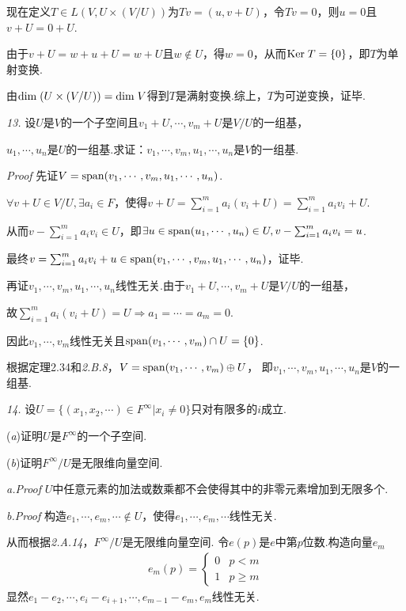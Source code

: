 现在定义\(T \in L(V,U \times (V/U))\)为\(Tv=(u,v+U)\)，令\(Tv=0\)，则\(u=0\)且\(v+U=0+U\).

由于\(v+U=w+u+U=w+U\)且\(w \notin U\)，得\(w=0\)，从而\(\mathrm{Ker \;} T=\{0\}\)，即\(T\)为单射变换.

由\(\mathrm{dim \;} (U \times (V/U))=\mathrm{dim \;} V\)得到\(T\)是满射变换.综上，\(T\)为可逆变换，证毕.

\newpage

\textit{13.}
设\(U\)是\(V\)的一个子空间且\(v_1+U,\cdots,v_m+U\)是\(V/U\)的一组基，

\(u_1,\cdots,u_n\)是\(U\)的一组基.求证：\(v_1,\cdots,v_m,u_1,\cdots,u_n\)是\(V\)的一组基.

\textit{Proof}
先证\(V=\mathrm{span} (v_1,\cdots,v_m,u_1,\cdots,u_n)\).

\(\forall v+U \in V/U, \exists a_i \in F\)，使得\(v+U=\sum_{i=1}^m a_i(v_i+U)=\sum_{i=1}^m a_iv_i+U\).

从而\(v-\sum_{i=1}^m a_iv_i \in U\)，即\(\exists u \in \mathrm{span} (u_1,\cdots,u_n) \in U,v-\sum_{i=1}^m a_iv_i=u\).

最终\(v=\sum_{i=1}^m a_iv_i+u \in \mathrm{span} (v_1,\cdots,v_m,u_1,\cdots,u_n)\)，证毕.

再证\(v_1,\cdots,v_m,u_1,\cdots,u_n\)线性无关.由于\(v_1+U,\cdots,v_m+U\)是\(V/U\)的一组基，

故\(\sum_{i=1}^m a_i(v_i+U)=U \Rightarrow a_1=\cdots=a_m=0\).

因此\(v_1,\cdots,v_m\)线性无关且\(\mathrm{span} (v_1,\cdots,v_m) \cap U=\{0\}\).

根据定理2.34和\textit{2.B.8}，\(V=\mathrm{span} (v_1,\cdots,v_m) \oplus U\)，
即\(v_1,\cdots,v_m,u_1,\cdots,u_n\)是\(V\)的一组基.

\hspace*{\fill}

\textit{14.}
设\(U=\{(x_1,x_2,\cdots)\in F^\infty | x_i \ne 0\}\)只对有限多的\(i\)成立.

(\textit{a})证明\(U\)是\(F^\infty\)的一个子空间.

(\textit{b})证明\(F^\infty /U\)是无限维向量空间.

\textit{a.Proof}
\(U\)中任意元素的加法或数乘都不会使得其中的非零元素增加到无限多个.

\textit{b.Proof}
构造\(e_1,\cdots,e_m,\cdots \notin U\)，使得\(e_1,\cdots,e_m,\cdots\)线性无关.

从而根据\textit{2.A.14}，\(F^\infty /U\)是无限维向量空间.
令\(e(p)\)是\(e\)中第\(p\)位数.构造向量\(e_m\)
    \begin{align*}
        e_m(p)=
            \begin{cases}
                0 & p<m \\
                1 & p \geq m
            \end{cases}
    \end{align*}
显然\(e_1-e_2,\cdots,e_i-e_{i+1},\cdots,e_{m-1}-e_m,e_m\)线性无关.

